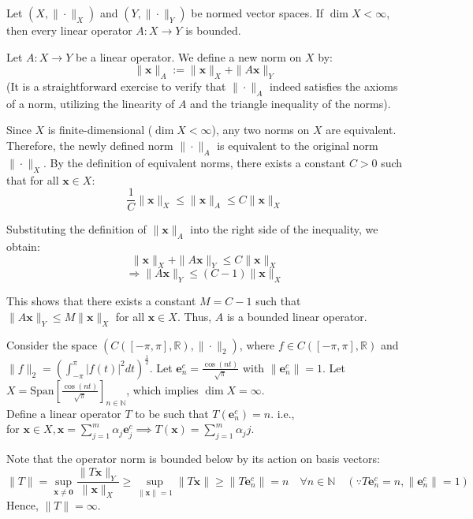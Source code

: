 \begin{theorem}
    Let $(X, \|\cdot\|_X)$ and $(Y, \|\cdot\|_Y)$ be normed vector spaces. If $\dim X < \infty$, then every linear operator $A: X \to Y$ is bounded.
\end{theorem}

\begin{pfbox}
    Let $A: X \to Y$ be a linear operator. We define a new norm on $X$ by:
    \[ \|\mathbf{x}\|_A := \|\mathbf{x}\|_X + \|A\mathbf{x}\|_Y \]
    (It is a straightforward exercise to verify that $\|\cdot\|_A$ indeed satisfies the axioms of a norm, utilizing the linearity of $A$ and the triangle inequality of the norms).

    Since $X$ is finite-dimensional ($\dim X < \infty$), any two norms on $X$ are equivalent. Therefore, the newly defined norm $\|\cdot\|_A$ is equivalent to the original norm $\|\cdot\|_X$. 
    By the definition of equivalent norms, there exists a constant $C > 0$ such that for all $\mathbf{x} \in X$:
    \[ \frac{1}{C}\|\mathbf{x}\|_X \le \|\mathbf{x}\|_A \le C\|\mathbf{x}\|_X \]
    
    Substituting the definition of $\|\mathbf{x}\|_A$ into the right side of the inequality, we obtain:
    \[ \|\mathbf{x}\|_X + \|A\mathbf{x}\|_Y \le C\|\mathbf{x}\|_X \]
    \[ \Rightarrow \|A\mathbf{x}\|_Y \le (C - 1)\|\mathbf{x}\|_X \]
    
    This shows that there exists a constant $M = C - 1$ such that $\|A\mathbf{x}\|_Y \le M\|\mathbf{x}\|_X$ for all $\mathbf{x} \in X$. Thus, $A$ is a bounded linear operator.
\end{pfbox}

\begin{example}
    Consider the space $(C([-\pi, \pi], \mathbb{R}), \|\cdot\|_2)$, where $f \in C([-\pi, \pi], \mathbb{R})$ and 
    $\displaystyle \|f\|_2 = \left( \int_{-\pi}^{\pi} |f(t)|^2 dt \right)^{\frac{1}{2}}$.
    Let $\displaystyle \mathbf{e}_n^c = \frac{\cos(nt)}{\sqrt{\pi}}$ with $\|\mathbf{e}_n^c\| = 1$. Let $X = \text{Span} \left[ \frac{\cos(nt)}{\sqrt{\pi}} \right]_{n \in \mathbb{N}}$, which implies $\dim X = \infty$. \\
    Define a linear operator $T$ to be such that $T(\mathbf{e}_n^c) = n$. i.e.,\\
    for $\mathbf{x} \in X, \mathbf{x} = \sum_{j=1}^m \alpha_j \mathbf{e}_j^c \implies T(\mathbf{x}) = \sum_{j=1}^m \alpha_j j$.

    Note that the operator norm is bounded below by its action on basis vectors:
    \[ \|T\| = \sup_{\mathbf{x} \neq \mathbf{0}} \frac{\|T\mathbf{x}\|_Y}{\|\mathbf{x}\|_X} \ge \sup_{\|\mathbf{x}\|=1} \|T\mathbf{x}\| \ge \|T\mathbf{e}_n^c\| = n \quad \forall n \in \mathbb{N} \quad (\because T\mathbf{e}_n^c = n, \|\mathbf{e}_n^c\| = 1) \]
    Hence, $\|T\| = \infty$. 
\end{example}



